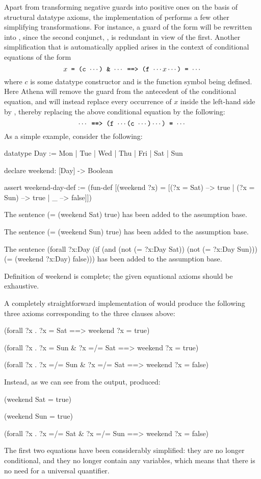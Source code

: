 Apart from transforming negative guards into positive ones on the basis
of structural datatype axioms, the implementation of 
performs a few other simplifying transformations. For instance, a guard
of the form  will be rewritten into
, since the second conjunct, ,
is redundant in view of the first. Another simplification that is
automatically applied arises in the context of conditional equations
of the form 
$$\mbox{\tt $x$ = (c $\cdots$) \& $\cdots$ ==> (f $\cdots x \cdots$) = $\cdots$}$$
where $c$ is some datatype constructor and  is the function symbol
being defined. Here Athena will remove the guard 
 from the antecedent of the conditional equation, 
and will instead replace every occurrence of $x$ inside the left-hand side
 by , thereby replacing the
above conditional equation by the following:
$$\mbox{\tt $\cdots$ ==> (f $\cdots \mbox{\tt (c $\cdots$)} \cdots$) = $\cdots$}$$
As a simple example, consider the following:
\begin{tcAthena}
datatype Day := Mon | Tue | Wed | Thu | Fri | Sat | Sun

declare weekend: [Day] -> Boolean

assert weekend-day-def :=
  (fun-def [(weekend ?x) = 
              [(?x = Sat) --> true
             | (?x = Sun) --> true
             | _ --> false]])

The sentence 
(= (weekend Sat)
   true)
has been added to the assumption base.

The sentence 
(= (weekend Sun)
   true)
has been added to the assumption base.

The sentence 
(forall ?x:Day
  (if (and (not (= ?x:Day Sat))
           (not (= ?x:Day Sun)))
      (= (weekend ?x:Day)
         false)))
has been added to the assumption base.

Definition of weekend is complete; the given equational axioms should be exhaustive.
\end{tcAthena}
A completely straightforward implementation of 
would produce the following three axioms corresponding to the
three clauses above: 
\begin{tcAthena}
(forall ?x . ?x = Sat ==> weekend ?x = true)

(forall ?x . ?x = Sun & ?x =/= Sat ==> weekend ?x = true)

(forall ?x . ?x =/= Sun & ?x =/= Sat ==> weekend ?x = false)
\end{tcAthena}
Instead, as we can see from the output,  produced: 
\begin{tcAthena}
(weekend Sat = true)

(weekend Sun = true)

(forall ?x . ?x =/= Sat & ?x =/= Sun ==> weekend ?x = false)
\end{tcAthena}
The first two equations have been considerably simplified: they are
no longer conditional, and they no longer contain any variables,
which means that there is no need for a universal quantifier. 

